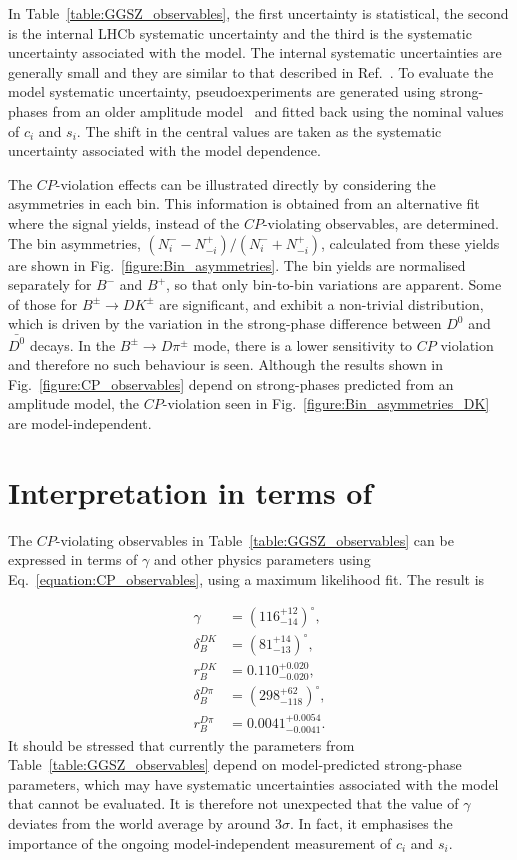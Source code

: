\documentclass[12pt, a4paper, notitlepage, onecolumn]{article}
\begin{document}
In Table~\ref{table:GGSZ_observables}, the first uncertainty is statistical, the second is the internal LHCb systematic uncertainty and the third is the systematic uncertainty associated with the model. The internal systematic uncertainties are generally small and they are similar to that described in Ref.~\cite{LHCb-PAPER-2020-019}. To evaluate the model systematic uncertainty, pseudoexperiments are generated using strong-phases from an older amplitude model~\cite{CLEO_KKpipi_cisi} and fitted back using the nominal values of $c_i$ and $s_i$. The shift in the central values are taken as the systematic uncertainty associated with the model dependence.

The $C\!P$-violation effects can be illustrated directly by considering the asymmetries in each bin. This information is obtained from an alternative fit where the signal yields, instead of the $C\!P$-violating observables, are determined. The bin asymmetries, $(N_i^- - N_{-i}^+)/(N_i^- + N_{-i}^+)$, calculated from these yields are shown in Fig.~\ref{figure:Bin_asymmetries}. The bin yields are normalised separately for $B^-$ and $B^+$, so that only bin-to-bin variations are apparent. Some of those for $B^\pm\to DK^\pm$ are significant, and exhibit a non-trivial distribution, which is driven by the variation in the strong-phase difference between $D^0$ and $\bar{D^0}$ decays. In the $B^\pm\to D\pi^\pm$ mode, there is a lower sensitivity to $C\!P$ violation and therefore no such behaviour is seen. Although the results shown in Fig.~\ref{figure:CP_observables} depend on strong-phases predicted from an amplitude model, the $C\!P$-violation seen in Fig.~\ref{figure:Bin_asymmetries_DK} are model-independent.

\section{Interpretation in terms of \texorpdfstring{\boldmath{$\gamma$}}{gamma}}
\noindent The $C\!P$-violating observables in Table~\ref{table:GGSZ_observables} can be expressed in terms of $\gamma$ and other physics parameters using Eq.~\eqref{equation:CP_observables}, using a maximum likelihood fit. The result is

\begin{align*}
    \gamma &= (116^{+12}_{-14})^\circ, \\
    \delta_B^{DK} &= (81^{+14}_{-13})^\circ, \\
    r_B^{DK} &= 0.110^{+0.020}_{-0.020}, \\
    \delta_B^{D\pi} &= (298^{+62}_{-118})^\circ, \\
    r_B^{D\pi} &= 0.0041^{+0.0054}_{-0.0041}.
\end{align*}
It should be stressed that currently the parameters from Table~\ref{table:GGSZ_observables} depend on model-predicted strong-phase parameters, which may have systematic uncertainties associated with the model that cannot be evaluated. It is therefore not unexpected that the value of $\gamma$ deviates from the world average by around $3\sigma$. In fact, it emphasises the importance of the ongoing model-independent measurement of $c_i$ and $s_i$.
\end{document}
